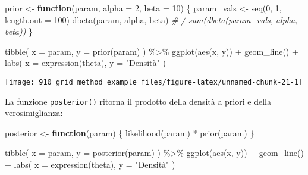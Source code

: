 \documentclass[
]{memoir}
\newenvironment{Shaded}{\begin{snugshade}}{\end{snugshade}}
\newcommand{\AttributeTok}[1]{\textcolor[rgb]{0.77,0.63,0.00}{#1}}
\newcommand{\CommentTok}[1]{\textcolor[rgb]{0.56,0.35,0.01}{\textit{#1}}}
\newcommand{\ControlFlowTok}[1]{\textcolor[rgb]{0.13,0.29,0.53}{\textbf{#1}}}
\newcommand{\DecValTok}[1]{\textcolor[rgb]{0.00,0.00,0.81}{#1}}
\newcommand{\FunctionTok}[1]{\textcolor[rgb]{0.00,0.00,0.00}{#1}}
\newcommand{\NormalTok}[1]{#1}
\newcommand{\OtherTok}[1]{\textcolor[rgb]{0.56,0.35,0.01}{#1}}
\newcommand{\SpecialCharTok}[1]{\textcolor[rgb]{0.00,0.00,0.00}{#1}}
\newcommand{\StringTok}[1]{\textcolor[rgb]{0.31,0.60,0.02}{#1}}
\begin{document}
\begin{Shaded}
\begin{Highlighting}[]
\NormalTok{prior }\OtherTok{\textless{}{-}} \ControlFlowTok{function}\NormalTok{(param, }\AttributeTok{alpha =} \DecValTok{2}\NormalTok{, }\AttributeTok{beta =} \DecValTok{10}\NormalTok{) \{}
\NormalTok{  param\_vals }\OtherTok{\textless{}{-}} \FunctionTok{seq}\NormalTok{(}\DecValTok{0}\NormalTok{, }\DecValTok{1}\NormalTok{, }\AttributeTok{length.out =} \DecValTok{100}\NormalTok{)}
  \FunctionTok{dbeta}\NormalTok{(param, alpha, beta) }\CommentTok{\# / sum(dbeta(param\_vals, alpha, beta))}
\NormalTok{\}}

\FunctionTok{tibble}\NormalTok{(}
  \AttributeTok{x =}\NormalTok{ param,}
  \AttributeTok{y =} \FunctionTok{prior}\NormalTok{(param)}
\NormalTok{) }\SpecialCharTok{\%\textgreater{}\%}
  \FunctionTok{ggplot}\NormalTok{(}\FunctionTok{aes}\NormalTok{(x, y)) }\SpecialCharTok{+}
  \FunctionTok{geom\_line}\NormalTok{() }\SpecialCharTok{+}
  \FunctionTok{labs}\NormalTok{(}
    \AttributeTok{x =} \FunctionTok{expression}\NormalTok{(theta),}
    \AttributeTok{y =} \StringTok{"Densità"}
\NormalTok{  )}
\end{Highlighting}
\end{Shaded}

\begin{center}\texttt{[image: 910\_grid\_method\_example\_files/figure-latex/unnamed-chunk-21-1]} \end{center}

La funzione \texttt{posterior()} ritorna il prodotto della densità a priori e della verosimiglianza:

\begin{Shaded}
\begin{Highlighting}[]
\NormalTok{posterior }\OtherTok{\textless{}{-}} \ControlFlowTok{function}\NormalTok{(param) \{}
  \FunctionTok{likelihood}\NormalTok{(param) }\SpecialCharTok{*} \FunctionTok{prior}\NormalTok{(param)}
\NormalTok{\}}

\FunctionTok{tibble}\NormalTok{(}
  \AttributeTok{x =}\NormalTok{ param,}
  \AttributeTok{y =} \FunctionTok{posterior}\NormalTok{(param)}
\NormalTok{) }\SpecialCharTok{\%\textgreater{}\%}
  \FunctionTok{ggplot}\NormalTok{(}\FunctionTok{aes}\NormalTok{(x, y)) }\SpecialCharTok{+}
  \FunctionTok{geom\_line}\NormalTok{() }\SpecialCharTok{+}
  \FunctionTok{labs}\NormalTok{(}
    \AttributeTok{x =} \FunctionTok{expression}\NormalTok{(theta),}
    \AttributeTok{y =} \StringTok{"Densità"}
\NormalTok{  )}
\end{Highlighting}
\end{Shaded}
\end{document}
